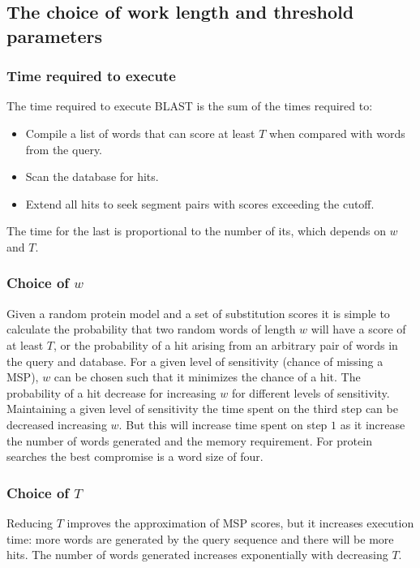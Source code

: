 	\subsection{The choice of work length and threshold parameters}

		\subsubsection{Time required to execute}
		The time required to execute BLAST is the sum of the times required to:

		\begin{multicols}{2}
			\begin{itemize}
				\item Compile a list of words that can score at least $T$ when compared with words from the query.
				\item Scan the database for hits.
				\item Extend all hits to seek segment pairs with scores exceeding the cutoff.
			\end{itemize}
		\end{multicols}

		The time for the last is proportional to the number of its, which depends on $w$ and $T$.

		\subsubsection{Choice of $w$}
		Given a random protein model and a set of substitution scores it is simple to calculate the probability that two random words of length $w$ will have a score of at least $T$, or the probability of a hit arising from an arbitrary pair of words in the query and database.
		For a given level of sensitivity (chance of missing a MSP), $w$ can be chosen such that it minimizes the chance of a hit.
		The probability of a hit decrease for increasing $w$ for different levels of sensitivity.
		Maintaining a given level of sensitivity the time spent on the third step can be decreased increasing $w$.
		But this will increase time spent on step $1$ as it increase the number of words generated and the memory requirement.
		For protein searches the best compromise is a word size of four.

		\subsubsection{Choice of $T$}
		Reducing $T$ improves the approximation of MSP scores, but it increases execution time: more words are generated by the query sequence and there will be more hits.
		The number of words generated increases exponentially with decreasing $T$.

